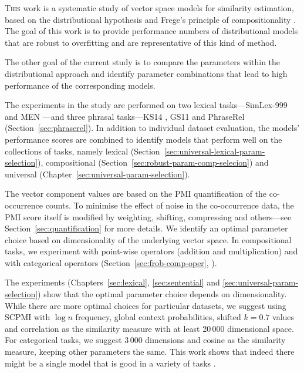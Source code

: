 \documentclass[11pt,a4paper,english,oneside]{book}
\newcommand\newcite\citet
\renewcommand\cite\citep
\begin{document}
\lettrine[lines=5,loversize=0.25]{T}{his} work is a systematic study of vector space models for similarity estimation, based on the distributional hypothesis \cite{harris1954distributional} and Frege's principle of compositionality \cite{Janssen2001,DBLP:journals/corr/abs-1003-4394}. The goal of this work is to provide performance numbers of distributional models that are robust to overfitting and are representative of this kind of method.


The other goal of the current study is to compare the parameters within the distributional approach and identify parameter combinations that lead to high performance of the corresponding models.

The experiments in the study are performed on two lexical tasks---SimLex-999 \cite{hill2014simlex} and MEN \cite{Bruni:2014:MDS:2655713.2655714}---and three phrasal tasks---KS14 \cite{kartsadrqpl2014}, GS11 \cite{Grefenstette:2011:ETV:2140490.2140497} and PhraseRel (Section~\ref{sec:phraserel}). In addition to individual dataset evaluation, the models' performance scores are combined to identify models that perform well on the collections of tasks, namely lexical (Section~\ref{sec:universal-lexical-param-selection}), compositional (Section~\ref{sec:robust-param-comp-selecion}) and universal (Chapter~\ref{sec:universal-param-selection}).

The vector component values are based on the PMI quantification of the co-occurrence counts. To minimise the effect of noise in the co-occurrence data, the PMI score itself is modified by weighting, shifting, compressing and others---see Section~\ref{sec:quantification} for more details. We identify an optimal parameter choice based on dimensionality of the underlying vector space. In compositional tasks, we experiment with point-wise operators (addition and multiplication) and with categorical operators (Section~\ref{sec:frob-comp-oper}, \newcite{DBLP:journals/corr/abs-1003-4394}).

The experiments (Chapters~\ref{sec:lexical}, \ref{sec:sentential} and \ref{sec:universal-param-selection}) show that the optimal parameter choice depends on dimensionality. While there are more optimal choices for particular datasets, we suggest using SCPMI with $\log n$ frequency, global context probabilities, shifted $k=0.7$ values and correlation as the similarity measure with at least 20\,000 dimensional space. For categorical tasks, we suggest 3\,000 dimensions and cosine as the similarity measure, keeping other parameters the same. This work shows that indeed there might be a single model that is good in a variety of tasks \cite{doi:10.1080/02643294.2016.1176907}.
%
%
\end{document}
